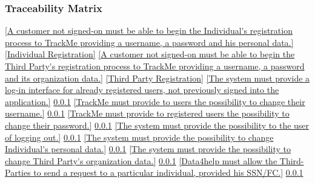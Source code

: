 \documentclass[a4paper]{article}
\begin{document}
        \subsubsection{Traceability Matrix}
        \begin{traceabilitymatrix}
            \con{\ref{Allow a Guest to register as an Individual.}}
                {\ref{A customer not signed-on must be able to begin the Individual's registration process to TrackMe providing a username, a password and his personal data.}}
                {\ref{Individual Registration}}
                {}
            \con{\ref{Allow a Guest to register as an Third-Party.}}
                {\ref{A customer not signed-on must be able to begin the Third Party's registration process to TrackMe providing a username, a password and its organization data.}}
                {\ref{Third Party Registration}}
                {}
            \con{\ref{The Guest should be able to sign in into the application.}}
                {\ref{The system must provide a log-in interface for already registered users, not previously signed into the application.}}
                {\ref{}}
                {}
            \con{\ref{The User should be able to change his username.}}
                {\ref{TrackMe must provide to users the possibility to change their username.}}
                {\ref{}}
                {}
            \con{\ref{The User should be able to change his password.}}
                {\ref{TrackMe must provide to registered users the possibility to change their password.}}
                {\ref{}}
                {}
            \con{\ref{The User should be able to log-out from the system.}}
                {\ref{The system must provide the possibility to the user of logging out.}}
                {\ref{}}
                {}
            \con{\ref{The Individual should be able to change his personal data.}}
                {\ref{The system must provide the possibility to change Individual's personal data.}}
                {\ref{}}
                {}
            \con{\ref{The Third-Party should be able to change his organization data.}}
                {\ref{The system must provide the possibility to change Third Party's organization data.}}
                {\ref{}}
                {}
            \con{\ref{The Third-Party should be able to send requests to the Individuals.}}
                {\ref{Data4help must allow the Third-Parties to send a request to a particular individual, provided his SSN/FC.}}
                {\ref{}}
                {}
            \con{\ref{The Third-Party should be able to make group requests.}}

\end{traceabilitymatrix}
\end{document}

